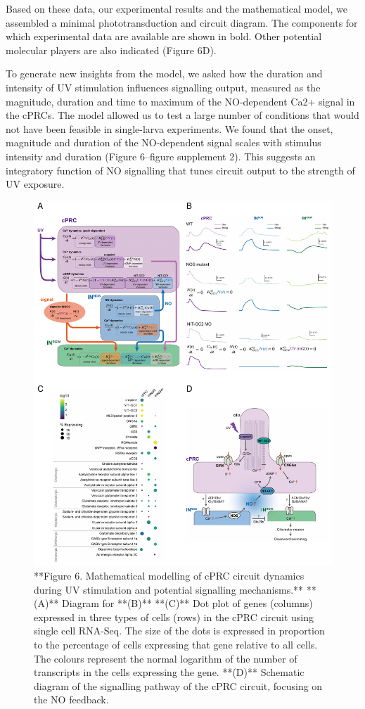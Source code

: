 \documentclass[
  10pt,
  onecolumn]{article}
\begin{document}
Based on these data, our experimental results and the mathematical
model, we assembled a minimal phototransduction and circuit diagram. The
components for which experimental data are available are shown in bold.
Other potential molecular players are also indicated (Figure 6D).

To generate new insights from the model, we asked how the duration and
intensity of UV stimulation influences signalling output, measured as
the magnitude, duration and time to maximum of the NO-dependent Ca2+
signal in the cPRCs. The model allowed us to test a large number of
conditions that would not have been feasible in single-larva
experiments. We found that the onset, magnitude and duration of the
NO-dependent signal scales with stimulus intensity and duration (Figure
6--figure supplement 2). This suggests an integratory function of NO
signalling that tunes circuit output to the strength of UV exposure.

\begin{figure}
\includegraphics[width=25in]{figures/Fig6} \caption{**Figure 6. Mathematical modelling of cPRC circuit dynamics during UV stimulation and potential signalling mechanisms.**  **(A)** Diagram for **(B)** **(C)** Dot plot of genes (columns) expressed in three types of cells (rows) in the cPRC circuit using single cell RNA-Seq. The size of the dots is expressed in proportion to the percentage of cells expressing that gene relative to all cells. The colours represent the normal logarithm of the number of transcripts in the cells expressing the gene. **(D)** Schematic diagram of the signalling pathway of the cPRC circuit, focusing on the NO feedback.}\label{fig:unnamed-chunk-6}
\end{figure}
\end{document}
